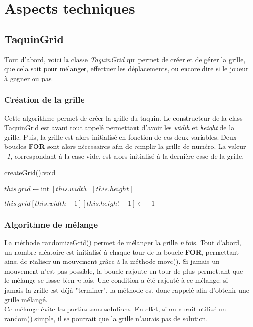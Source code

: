 \chapter{Aspects techniques}

	\section{TaquinGrid}

		Tout d'abord, voici la classe \textit{TaquinGrid} qui permet de créer et de gérer la grille, que cela soit pour mélanger, effectuer les déplacements, ou encore dire si le joueur à gagner ou pas.

		\subsection{Création de la grille}

			Cette algorithme permet de créer la grille du taquin. Le constructeur de la class TaquinGrid est avant tout appelé permettant d'avoir les \textit{width} et \textit{height} de la grille. Puis, la grille est alors initialisé en fonction de ces deux variables. Deux boucles \textbf{FOR} sont alors nécessaires afin de remplir la grille de numéro. La valeur \textit{-1}, correspondant à la case vide, est alors initialisé à la dernière case de la grille.\\


			\begin{algorithm}[H]
				\caption{createGrid():void}
				$this.grid \leftarrow $int $[this.width][this.height]$


				$this.grid[this.width-1][this.height-1] \leftarrow -1$
			\end{algorithm}

		\subsection{Algorithme de mélange}

			La méthode randomizeGrid() permet de mélanger la grille \textit{n} fois. Tout d'abord, un nombre aléatoire est initialisé à chaque tour de la boucle \textbf{FOR}, permettant ainsi de réaliser un mouvement grâce à la méthode move(). Si jamais un mouvement n'est pas possible, la boucle rajoute un tour de plus permettant que le mélange se fasse bien \textit{n} fois. Une condition a été rajouté à ce mélange: si jamais la grille est déjà "terminer", la méthode est donc rappelé afin d'obtenir une grille mélangé.\\
			Ce mélange évite les parties sans solutions. En effet, si on aurait utilisé un random() simple, il se pourrait que la grille n'aurais pas de solution.\\

